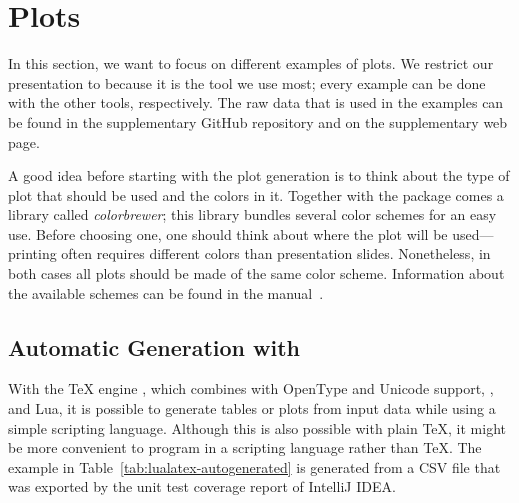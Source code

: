 \section{Plots}

In this section, we want to focus on different examples of plots.  We restrict
our presentation to  because it is the tool we use most;
every example can be done with the other tools, respectively.  The raw data that
is used in the examples can be found in the supplementary GitHub
repository and on the supplementary web
page.

A good idea before starting with the plot generation is to think about the type
of plot that should be used and the colors in it.  Together with the
 package comes a library called \emph{colorbrewer}; this
library bundles several color schemes for an easy use.  Before choosing one,
one should think about where the plot will be used—printing often requires
different colors than presentation slides.  Nonetheless, in both cases all plots
should be made of the same color scheme.  Information about the available
schemes can be found in the 
manual~\cite[Sect.~5.2]{Feuersaenger2016}.

\subsection{Automatic Generation with }

With the \TeX{} engine , which combines  with
OpenType and Unicode support, , and Lua, it is possible to
generate tables or plots from input data while using a simple scripting
language.  Although this is also possible with plain \TeX{}, it might be more
convenient to program in a scripting language rather than \TeX{}.  The example
in Table~\ref{tab:lualatex-autogenerated} is generated from a CSV file that was
exported by the unit test coverage report of IntelliJ IDEA.

